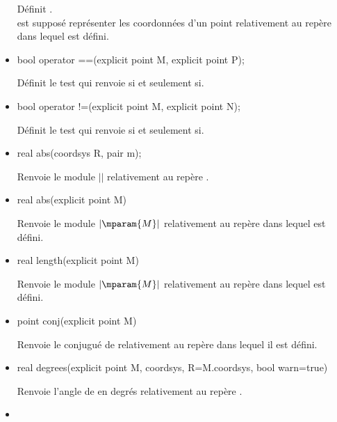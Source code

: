 \documentclass[pdftex]{article}
\newcommand{\ssi}{si et seulement si\xspace}
\begin{document}
\begin{itemize}
\begin{Vcolor}
  \end{Vcolor}
  Définit .\\
   est supposé représenter les coordonnées d'un point relativement au
  repère dans lequel  est défini.
\item {}
  \begin{Vcolor}
    bool operator ==(explicit point M, explicit point P);
  \end{Vcolor}
  Définit le test  qui renvoie  \ssi {}.
\item {}
  \begin{Vcolor}
    bool operator !=(explicit point M, explicit point N);
  \end{Vcolor}
  Définit le test  qui renvoie  \ssi {}.
\item {}
  \begin{Vcolor}
    real abs(coordsys R, pair m);
  \end{Vcolor}
  Renvoie le module $\vert$$\vert$ relativement au repère .
\item {}
  \begin{Vcolor}
    real abs(explicit point M)
  \end{Vcolor}
  Renvoie le module $\vert\mparam{M}\vert$ relativement au repère dans
  lequel  est défini.
\item {}
  \begin{Vcolor}
    real length(explicit point M)
  \end{Vcolor}
  Renvoie le module $\vert\mparam{M}\vert$ relativement au repère dans
  lequel  est défini.
\item {}
  \begin{Vcolor}
    point conj(explicit point M)
  \end{Vcolor}
  Renvoie le conjugué de  relativement au repère dans lequel il est défini.
\item {}
  \begin{Vcolor}
    real degrees(explicit point M, coordsys,
    R=M.coordsys, bool warn=true)
  \end{Vcolor}
  Renvoie l'angle de  en degrés relativement au repère .
\item {}

\end{itemize}
\end{document}
